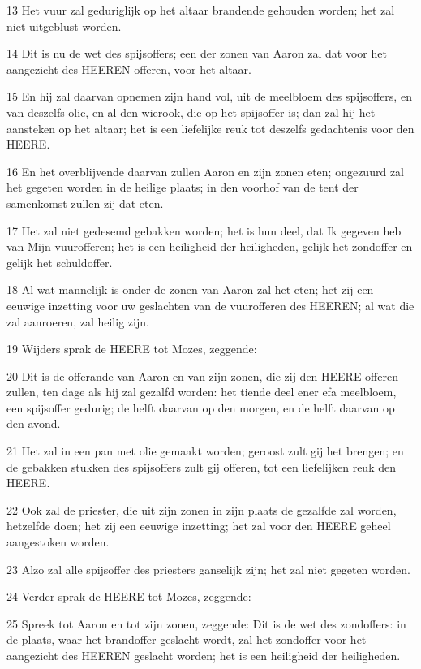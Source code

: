\par 13 Het vuur zal geduriglijk op het altaar brandende gehouden worden; het zal niet uitgeblust worden.
\par 14 Dit is nu de wet des spijsoffers; een der zonen van Aaron zal dat voor het aangezicht des HEEREN offeren, voor het altaar.
\par 15 En hij zal daarvan opnemen zijn hand vol, uit de meelbloem des spijsoffers, en van deszelfs olie, en al den wierook, die op het spijsoffer is; dan zal hij het aansteken op het altaar; het is een liefelijke reuk tot deszelfs gedachtenis voor den HEERE.
\par 16 En het overblijvende daarvan zullen Aaron en zijn zonen eten; ongezuurd zal het gegeten worden in de heilige plaats; in den voorhof van de tent der samenkomst zullen zij dat eten.
\par 17 Het zal niet gedesemd gebakken worden; het is hun deel, dat Ik gegeven heb van Mijn vuurofferen; het is een heiligheid der heiligheden, gelijk het zondoffer en gelijk het schuldoffer.
\par 18 Al wat mannelijk is onder de zonen van Aaron zal het eten; het zij een eeuwige inzetting voor uw geslachten van de vuurofferen des HEEREN; al wat die zal aanroeren, zal heilig zijn.
\par 19 Wijders sprak de HEERE tot Mozes, zeggende:
\par 20 Dit is de offerande van Aaron en van zijn zonen, die zij den HEERE offeren zullen, ten dage als hij zal gezalfd worden: het tiende deel ener efa meelbloem, een spijsoffer gedurig; de helft daarvan op den morgen, en de helft daarvan op den avond.
\par 21 Het zal in een pan met olie gemaakt worden; geroost zult gij het brengen; en de gebakken stukken des spijsoffers zult gij offeren, tot een liefelijken reuk den HEERE.
\par 22 Ook zal de priester, die uit zijn zonen in zijn plaats de gezalfde zal worden, hetzelfde doen; het zij een eeuwige inzetting; het zal voor den HEERE geheel aangestoken worden.
\par 23 Alzo zal alle spijsoffer des priesters ganselijk zijn; het zal niet gegeten worden.
\par 24 Verder sprak de HEERE tot Mozes, zeggende:
\par 25 Spreek tot Aaron en tot zijn zonen, zeggende: Dit is de wet des zondoffers: in de plaats, waar het brandoffer geslacht wordt, zal het zondoffer voor het aangezicht des HEEREN geslacht worden; het is een heiligheid der heiligheden.
